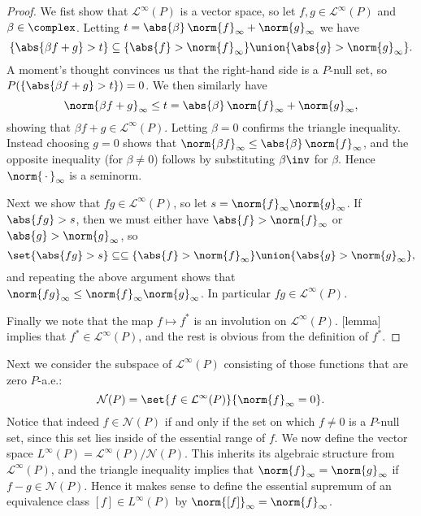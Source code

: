 \documentclass[article, a4paper, 11pt, oneside]{memoir}
\numberwithin{equation}{chapter}
\newcommand{\calN}{\mathcal{N}}
\newcommand{\calL}{\mathcal{L}}
\begin{document}
\begin{proof}
    We fist show that $\calL^\infty(P)$ is a vector space, so let $f,g \in \calL^\infty(P)$ and $\beta \in \complex$. Letting $t = \abs{\beta} \, \norm{f}_\infty + \norm{g}_\infty$ we have
    \begin{equation*}
        \{ \abs{\beta f + g} > t \}
            \subseteq \{ \abs{f} > \norm{f}_\infty \}
                      \union \{ \abs{g} > \norm{g}_\infty \}.
    \end{equation*}
    A moment's thought convinces us that the right-hand side is a $P$-null set, so $P( \{ \abs{\beta f + g} > t \}) = 0$. We then similarly have
    \begin{equation*}
        \norm{\beta f + g}_\infty
            \leq t
            = \abs{\beta} \, \norm{f}_\infty + \norm{g}_\infty,
    \end{equation*}
    showing that $\beta f + g \in \calL^\infty(P)$. Letting $\beta = 0$ confirms the triangle inequality. Instead choosing $g = 0$ shows that $\norm{\beta f}_\infty \leq \abs{\beta} \, \norm{f}_\infty$, and the opposite inequality (for $\beta \neq 0$) follows by substituting $\beta\inv$ for $\beta$. Hence $\norm{\,\cdot\,}_\infty$ is a seminorm.

    Next we show that $fg \in \calL^\infty(P)$, so let $s = \norm{f}_\infty \norm{g}_\infty$. If $\abs{fg} > s$, then we must either have $\abs{f} > \norm{f}_\infty$ or $\abs{g} > \norm{g}_\infty$, so
    \begin{equation*}
        \set{\abs{fg} > s}
            \subseteq \subseteq \{ \abs{f} > \norm{f}_\infty \}
            \union \{ \abs{g} > \norm{g}_\infty \},
    \end{equation*}
    and repeating the above argument shows that $\norm{fg}_\infty \leq \norm{f}_\infty \norm{g}_\infty$. In particular $fg \in \calL^\infty(P)$.

    Finally we note that the map $f \mapsto f^*$ is an involution on $\calL^\infty(P)$. [lemma] implies that $f^* \in \calL^\infty(P)$, and the rest is obvious from the definition of $f^*$.
\end{proof}

Next we consider the subspace of $\calL^\infty(P)$ consisting of those functions that are zero $P$-a.e.:
%
\begin{equation*}
    \calN(P)
        = \set{f \in \calL^\infty(P)}{\norm{f}_\infty = 0}.
\end{equation*}
%
Notice that indeed $f \in \calN(P)$ if and only if the set on which $f \neq 0$ is a $P$-null set, since this set lies inside of the essential range of $f$. We now define the vector space $L^\infty(P) = \calL^\infty(P)/\calN(P)$. This inherits its algebraic structure from $\calL^\infty(P)$, and the triangle inequality implies that $\norm{f}_\infty = \norm{g}_\infty$ if $f-g \in \calN(P)$. Hence it makes sense to define the essential supremum of an equivalence class $[f] \in L^\infty(P)$ by $\norm{[f]}_\infty = \norm{f}_\infty$.
\end{document}
